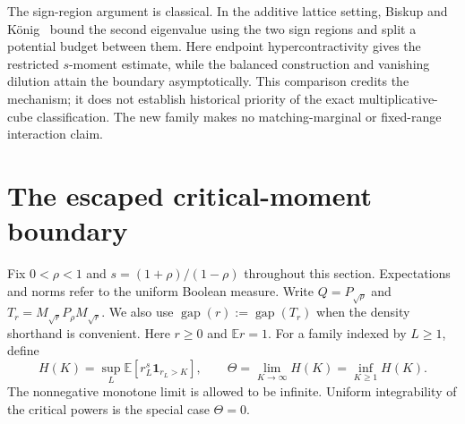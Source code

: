 \documentclass[11pt]{article}
\newcommand{\gap}{\operatorname{gap}}
\begin{document}
The sign-region argument is classical. In the additive lattice setting,
Biskup and K\"onig~\cite[Lemma~4.5 and Eq.~(4.29)]{BiskupKoenig}
bound the second eigenvalue using the two sign regions and split a
potential budget between them. Here endpoint hypercontractivity gives
the restricted $s$-moment estimate, while the balanced construction
and vanishing dilution attain the boundary asymptotically. This
comparison credits the mechanism; it does not establish historical
priority of the exact multiplicative-cube classification. The new
family makes no matching-marginal or fixed-range interaction claim.


\section{The escaped critical-moment boundary}
\label{sec:critical-tails}
Fix $0<\rho<1$ and $s=(1+\rho)/(1-\rho)$ throughout this section.
Expectations and norms refer to the uniform Boolean measure. Write
$Q=P_{\sqrt\rho}$ and $T_r=M_{\sqrt r}P_\rho M_{\sqrt r}$.
We also use $\gap(r):=\gap(T_r)$ when the density shorthand is convenient.
Here
$r\ge0$ and $\mathbb E r=1$. For a family indexed by $L\ge1$, define
\[
 H(K)=\sup_L\mathbb E[r_L^s\mathbf1_{r_L>K}],\qquad
 \Theta=\lim_{K\to\infty}H(K)=\inf_{K\ge1}H(K).
\]
The nonnegative monotone limit is allowed to be infinite. Uniform
integrability of the critical powers is the special case $\Theta=0$.
\end{document}
